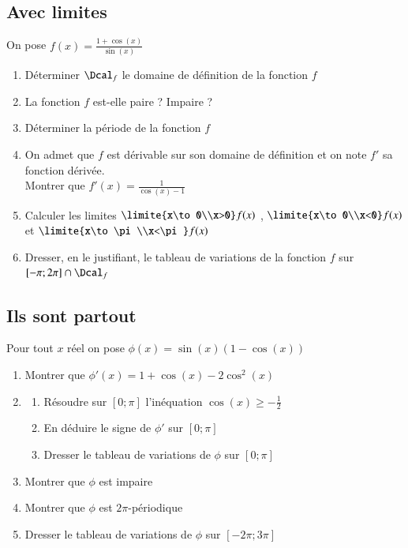 \documentclass[oneside,12pt]{article}          %
\begin{document}
\subsection{Avec limites}
On pose $f(x)=\frac{1+\cos(x)}{\sin(x)}$
\begin{enumerate}
    \item Déterminer $\Dcal_f$ le domaine de définition de la fonction $f$
    \item La fonction $f$ est-elle paire ? Impaire ?
    \item Déterminer la période de la fonction $f$
    \item On admet que $f$ est dérivable sur son domaine de définition et on note $f'$ sa fonction dérivée.\\
    Montrer que $f'(x)=\frac{1}{\cos(x)-1}$
    \item Calculer les limites $\limite{x\to0\\x>0}f(x)$ , $\limite{x\to0\\x<0}f(x)$ et $\limite{x\to\pi\\x<\pi}f(x)$
    \item Dresser, en le justifiant, le tableau de variations de la fonction $f$ sur $[-\pi;2\pi]\cap\Dcal_f$
\end{enumerate}



\subsection{Ils sont partout}
Pour tout $x$ réel on pose $\phi(x)=\sin(x)(1-\cos(x))$
\begin{enumerate}
    \item Montrer que $\phi'(x)=1+\cos(x)-2\cos^2(x)$
    \item \begin{enumerate}
        \item Résoudre sur $[0;\pi]$ l'inéquation $\cos(x)\geq-\frac{1}{2}$
        \item En déduire le signe de $\phi'$ sur $[0;\pi]$
        \item Dresser le tableau de variations de $\phi$ sur $[0;\pi]$
    \end{enumerate}
    \item Montrer que $\phi$ est impaire
    \item Montrer que $\phi$ est $2\pi$-périodique
    \item Dresser le tableau de variations de $\phi$ sur $[-2\pi;3\pi]$
\end{enumerate}
\end{document}
